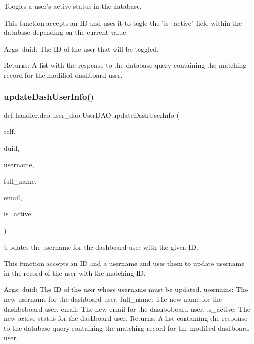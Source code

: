 \begin{DoxyVerb}Toogles a user's active status in the database.

This function accepts an ID and uses it to togle the "is_active" field
within the database depending on the current value.

Args:
    duid: The ID of the user that will be toggled.

Returns:
    A list with the response to the database query
    containing the matching record for the modified dashboard user.
\end{DoxyVerb}
 \mbox{\label{classhandler_1_1dao_1_1user__dao_1_1_user_d_a_o_aecd7d28a6180b613a29020d8a36aa49d}} 
\subsubsection{\texorpdfstring{update\+Dash\+User\+Info()}{updateDashUserInfo()}}
{\footnotesize\ttfamily def handler.\+dao.\+user\+\_\+dao.\+User\+D\+A\+O.\+update\+Dash\+User\+Info (\begin{DoxyParamCaption}\item[{}]{self,  }\item[{}]{duid,  }\item[{}]{username,  }\item[{}]{full\+\_\+name,  }\item[{}]{email,  }\item[{}]{is\+\_\+active }\end{DoxyParamCaption})}

\begin{DoxyVerb}Updates the username for the dashboard user with the given ID.

This function accepts an ID and a username and uses them 
to update username in the record of the user with the matching ID.

Args:
    duid: The ID of the user whose username must be updated.
    username: The new username for the dashboard user.
    full_name: The new name for the dashboboard user.
    email: The new email for the dashboboard user.
    is_active: The new active status for the dashboard user.
Returns:
    A list containing the response to the database query
    containing the matching record for the modified dashboard user.
\end{DoxyVerb}
 \mbox{\label{classhandler_1_1dao_1_1user__dao_1_1_user_d_a_o_a5cb109c59e12af858342091c0bff278b}} 
